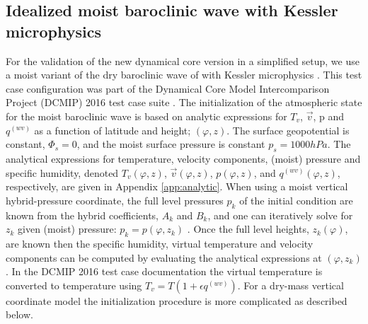 \documentclass{agujournal}
\begin{document}
{\subsection{Idealized moist baroclinic wave with Kessler microphysics}
For the validation of the new dynamical core version in a simplified setup, we use a moist variant of the dry baroclinic wave of \citet{UMJS2014QJRMS} with Kessler microphysics \citep{K1969MM}. This test case configuration was part of the Dynamical Core Model Intercomparison Project (DCMIP) 2016 test case suite \citep[][]{DCMIP16}. The initialization of the atmospheric state for the moist baroclinic wave is based on analytic expressions for $T_v$, $\vec{v}$, p and $q^{(wv)}$ as a function of latitude and height; $(\varphi,z)$. The surface geopotential is constant, $\Phi_s=0$, and the moist surface pressure is constant $p_s=1000hPa$. The analytical expressions for temperature, velocity components, (moist) pressure and specific humidity, denoted ${T_v}(\varphi,z)$, ${\vec{v}}(\varphi,z)$, ${p}(\varphi,z)$, and $q^{(wv)}(\varphi,z)$, respectively, are given in Appendix \ref{app:analytic}. When using a moist vertical hybrid-pressure coordinate, the full level pressures $p_k$ of the initial condition are known from the hybrid coefficients, $A_k$ and $B_k$, and one can iteratively solve for $z_k$ given (moist) pressure: $p_k={p}(\varphi,z_k)$ \citep[see, ][]{UMJS2014QJRMS}. Once the full level heights, $z_k(\varphi)$, are known then the specific humidity, virtual temperature and velocity components can be computed by evaluating the analytical expressions at $(\varphi,z_k)$. In the DCMIP 2016 test case documentation the virtual temperature is converted to temperature using $T_v=T\left( 1+\epsilon q^{(wv)}\right)$. For a dry-mass vertical coordinate model the initialization procedure is more complicated as described below.

}
\end{document}
